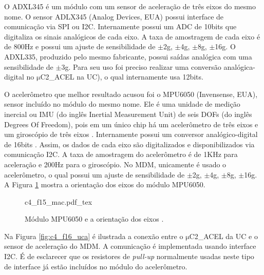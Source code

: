 O ADXL345 é um módulo com um sensor de aceleração de três eixos do mesmo nome. O sensor ADLX345 (Analog Devices, EUA) possui interface de comunicação via \acrshort{SPI} ou \acrshort{I2C}. Internamente possui um \acrshort{ADC} de 10bits que digitaliza os sinais analógicos de cada eixo. A taxa de amostragem de cada eixo é de 800Hz e possui um ajuste de sensibilidade de $\mathrm{\pm}$2g, $\mathrm{\pm}$4g, $\mathrm{\pm}$8g, $\mathrm{\pm}$16g. O ADXL335, produzido pelo mesmo fabricante, possui saídas analógica com uma sensibilidade de $\mathrm{\pm}$3g. Para seu uso foi preciso realizar uma conversão analógica-digital no $\mathrm{\mu}$C2\_ACEL na \acrshort{UC}), o qual internamente usa 12bits.

O acelerômetro que melhor resultado acusou foi o MPU6050 (Invensense, EUA), sensor incluído no módulo do mesmo nome. Ele é uma unidade de medição inercial ou \acrshort{IMU} (do inglês Inertial Measurement Unit) de seis \acrshort{DOF}s (do inglês Degrees Of Freedom), pois em um único chip há um acelerômetro de três eixos e um giroscópio de três eixos \cite{InvenSense2013}. Internamente possui um conversor analógico-digital de 16bits \cite{InvenSense2013}. Assim, os dados de cada eixo são digitalizados e disponibilizados via comunicação \acrshort{I2C}. A taxa de amostragem do acelerômetro é de 1KHz para aceleração e 200Hz para o giroscópio. No \acrshort{MDM}, unicamente é usado o acelerômetro, o qual possui um ajuste de sensibilidade de $\mathrm{\pm}$2g, $\mathrm{\pm}$4g, $\mathrm{\pm}$8g, $\mathrm{\pm}$16g. A Figura \ref{fig:c4_f15_mac} mostra a orientação dos eixos do módulo MPU6050.


\begin{figure}
    \centering %
    \small %
    \def\svgwidth{0.5\columnwidth}%
    {c4_f15_mac.pdf_tex}
    \caption{Módulo MPU6050 e a orientação dos eixos \cite{Naylamp2016}.}
    \label{fig:c4_f15_mac}
\end{figure}

Na Figura \ref{fig:c4_f16_uca} é ilustrada a conexão entre o $\mathrm{\mu}$C2\_ACEL da \acrshort{UC} e o sensor de aceleração do \acrshort{MDM}. A comunicação é implementada usando interface \acrshort{I2C}. É de esclarecer que os resistores de \textit{pull-up} normalmente usadas neste tipo de interface já estão incluídos no módulo do acelerômetro.


